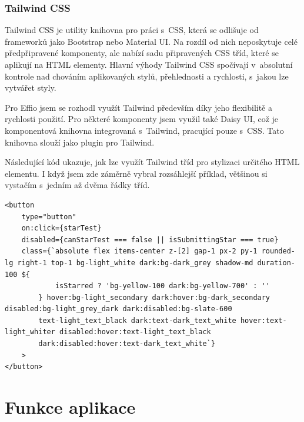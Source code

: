 \documentclass[12pt, a4paper,
openright
]{report}
\let\oldchapter\chapter
\renewcommand{\chapter}{
	\clearpage
	\pagestyle{fancy}
	\oldchapter
}
\begin{document}
\subsection{Tailwind CSS}
Tailwind CSS je utility knihovna pro práci s~CSS, která se odlišuje od frameworků jako Bootstrap nebo Material UI. Na rozdíl od nich neposkytuje celé předpřipravené komponenty, ale nabízí sadu připravených CSS tříd, které se aplikují na HTML elementy. Hlavní výhody Tailwind CSS spočívají v~absolutní kontrole nad chováním aplikovaných stylů, přehlednosti a rychlosti, s~jakou lze vytvářet styly.

Pro Effio jsem se rozhodl využít Tailwind především díky jeho flexibilitě a rychlosti použití. Pro některé komponenty jsem využil také Daisy UI, což je komponentová knihovna integrovaná s~Tailwind, pracující pouze s~CSS. Tato knihovna slouží jako plugin pro Tailwind.

Následující kód ukazuje, jak lze využít Tailwind tříd pro stylizaci určitého HTML elementu. I když jsem zde záměrně vybral rozsáhlejší příklad, většinou si vystačím s~jedním až dvěma řádky tříd.

\begin{lstlisting}[style=ES6, caption=Ukázka Tailwind kódu, label=tailwind-sample]
<button
	type="button"
	on:click={starTest}
	disabled={canStarTest === false || isSubmittingStar === true}
	class={`absolute flex items-center z-[2] gap-1 px-2 py-1 rounded-lg right-1 top-1 bg-light_white dark:bg-dark_grey shadow-md duration-100 ${
			isStarred ? 'bg-yellow-100 dark:bg-yellow-700' : ''
		} hover:bg-light_secondary dark:hover:bg-dark_secondary disabled:bg-light_grey_dark dark:disabled:bg-slate-600
		text-light_text_black dark:text-dark_text_white hover:text-light_whiter disabled:hover:text-light_text_black
		dark:disabled:hover:text-dark_text_white`}
	>
</button>
\end{lstlisting}

\chapter{Funkce aplikace}

\end{document}
